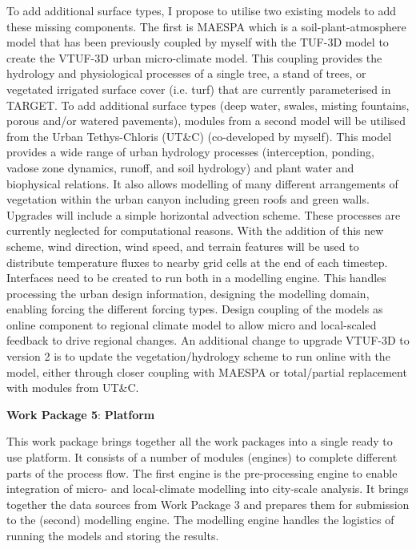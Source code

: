 To add additional surface types, I propose to utilise two existing models to add these missing components. The first is MAESPA\cite{Duursma2012} which is a soil-plant-atmosphere model that has been previously coupled by myself with the TUF-3D model\cite{Krayenhoff2007} to create the VTUF-3D\cite{Nice2018a} urban micro-climate model. This coupling provides the hydrology and physiological processes of a single tree, a stand of trees, or vegetated irrigated surface cover (i.e. turf) that are currently parameterised in TARGET. To add additional surface types (deep water, swales, misting fountains, porous and/or watered pavements), modules from a second model will be utilised from the Urban Tethys-Chloris (UT\&C)\cite{Meili2020} (co-developed by myself). This model provides a wide range of urban hydrology processes (interception, ponding, vadose zone dynamics, runoff, and soil hydrology) and plant water and biophysical relations. It also allows modelling of many different arrangements of vegetation within the urban canyon including green roofs and green walls. Upgrades will include a simple horizontal advection scheme. These processes are currently neglected for computational reasons. With the addition of this new scheme, wind direction, wind speed, and terrain features will be used to distribute temperature fluxes to nearby grid cells at the end of each timestep. Interfaces need to be created to run both in a modelling engine. This handles processing the urban design information, designing the modelling domain, enabling forcing the different forcing types. Design coupling of the models as online component to regional climate model to allow micro and local-scaled feedback to drive regional changes. An additional change to upgrade VTUF-3D to version 2 is to update the vegetation/hydrology scheme to run online with the model, either through closer coupling with MAESPA\cite{Duursma2012} or total/partial replacement with modules from UT\&C\cite{Meili2020}. 






\textbf{Work Package 5}: \textbf{Platform} \emph{  }

This work package brings together all the work packages into a single ready to use platform. It consists of a number of modules (engines) to complete different parts of the process flow. The first engine is the pre-processing engine to enable integration of micro- and local-climate modelling into city-scale analysis. It brings together the data sources from Work Package 3 and prepares them for submission to the (second) modelling engine. The modelling engine handles the logistics of running the models and storing the results. 


